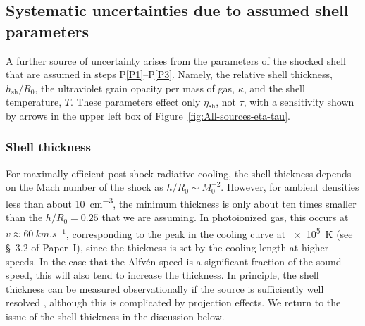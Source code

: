 \documentclass[useAMS, usenatbib, a4paper]{mnras}
\newcommand\shell{\ensuremath{_{\text{sh}}}}
\begin{document}
\subsection{Systematic uncertainties due to assumed shell parameters}
\label{sec:syst-uncert-due}

A further source of uncertainty arises from the parameters of the
shocked shell that are assumed in steps P\ref{P1}--P\ref{P3}. Namely,
the relative shell thickness, \(h\shell/R_0\), the ultraviolet grain
opacity per mass of gas, \(\kappa\), and the shell temperature, \(T\).
These parameters effect only \(\eta\shell\), not \(\tau\), with a
sensitivity shown by arrows in the upper left box of
Figure~\ref{fig:All-sources-eta-tau}.

\subsubsection{Shell thickness}
\label{sec:shell-thickness}
For maximally efficient post-shock radiative cooling, the shell
thickness depends on the Mach number of the shock as
\(h / R_0 \sim M_0^{-2}\).  However, for ambient densities less than
about \SI{10}{cm^{-3}}, the minimum thickness is only about ten times
smaller than the \(h / R_0 = 0.25\) that we are assuming.  In
photoionized gas, this occurs at \(v \approx \SI{60}{km.s^{-1}}\),
corresponding to the peak in the cooling curve at \SI{e5}{K} (see
\S~3.2 of Paper~I),
since the thickness is set by the cooling length at higher speeds.  In
the case that the Alfv\'en speed is a significant fraction of the
sound speed, this will also tend to increase the thickness.  In
principle, the shell thickness can be measured observationally if the
source is sufficiently well resolved \citep{Kobulnicky:2017a},
although this is complicated by projection effects.  We return to the
issue of the shell thickness in the discussion below.
\end{document}
